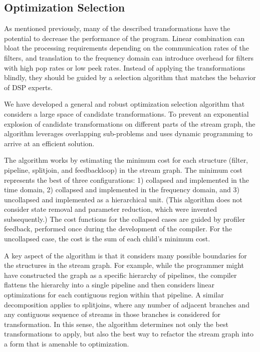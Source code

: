 \subsection*{Optimization Selection}

As mentioned previously, many of the described transformations have
the potential to decrease the performance of the program.  Linear
combination can bloat the processing requirements depending on the
communication rates of the filters, and translation to the frequency
domain can introduce overhead for filters with high pop rates or low
peek rates.  Instead of applying the transformations blindly, they
should be guided by a selection algorithm that matches the behavior of
DSP experts.

We have developed a general and robust optimization selection
algorithm that considers a large space of candidate transformations.
To prevent an exponential explosion of candidate transformations on
different parts of the stream graph, the algorithm leverages
overlapping sub-problems and uses dynamic programming to arrive at an
efficient solution.

The algorithm works by estimating the minimum cost for each structure
(filter, pipeline, splitjoin, and feedbackloop) in the stream
graph. The minimum cost represents the best of three configurations:
1) collapsed and implemented in the time domain, 2) collapsed and
implemented in the frequency domain, and 3) uncollapsed and
implemented as a hierarchical unit.  (This algorithm does not consider
state removal and parameter reduction, which were invented
subsequently.)  The cost functions for the collapsed cases are guided
by profiler feedback, performed once during the development of the
compiler.  For the uncollapsed case, the cost is the sum of each
child's minimum cost.

A key aspect of the algorithm is that it considers many possible
boundaries for the structures in the stream graph.  For example, while
the programmer might have constructed the graph as a specific
hierarchy of pipelines, the compiler flattens the hierarchy into a
single pipeline and then considers linear optimizations for each
contiguous region within that pipeline.  A similar decomposition
applies to splitjoins, where any number of adjacent branches and any
contiguous sequence of streams in those branches is considered for
transformation.  In this sense, the algorithm determines not only the
best transformations to apply, but also the best way to refactor the
stream graph into a form that is amenable to optimization.

